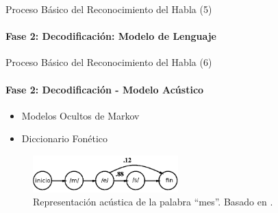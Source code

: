 \begin{frame}{Proceso B\'asico del Reconocimiento del Habla (5)}
\framesubtitle{Fase 2: Decodificaci\'on: Modelo de Lenguaje}
\vspace*{2\baselineskip}
\begin{itemize}
        \vspace*{1\baselineskip}
    \end{itemize}
\end{frame}

\begin{frame}{Proceso B\'asico del Reconocimiento del Habla (6)}
\framesubtitle{Fase 2: Decodificaci\'on - Modelo Acústico}

\begin{itemize}
    \item Modelos Ocultos de Markov
    \item Diccionario Fonético
\end{itemize}

\begin{figure}[H] 
\centering
\includegraphics[width=0.5\textwidth]{./graphics/hmm_palabra.png}
\caption{Representaci\'on ac\'ustica de la palabra ``mes''. Basado en \cite{Jurafsky}.}
\label{figure:hmm-palabra}
\end{figure}

\end{frame}

